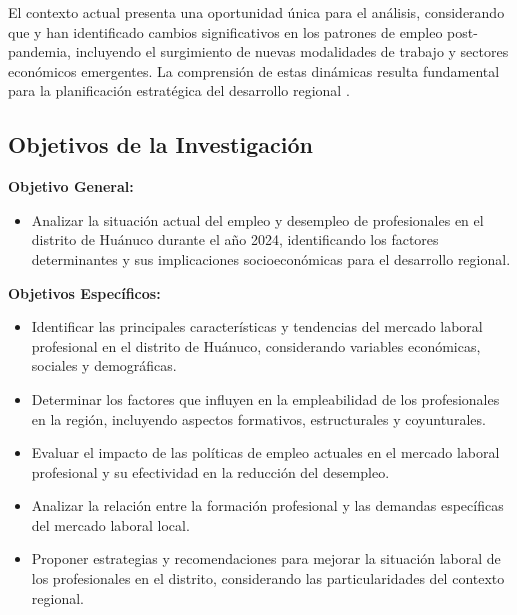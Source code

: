 \documentclass[12pt,a4paper]{article}
\begin{document}
El contexto actual presenta una oportunidad única para el análisis, considerando que \cite{navarro2024oportunidades} y \cite{paz2023mercado} han identificado cambios significativos en los patrones de empleo post-pandemia, incluyendo el surgimiento de nuevas modalidades de trabajo y sectores económicos emergentes. La comprensión de estas dinámicas resulta fundamental para la planificación estratégica del desarrollo regional \citep{guerra2024planificacion, ruiz2023estrategias}.

\subsection{Objetivos de la Investigación}

\textbf{Objetivo General:}
\begin{itemize}
    \item Analizar la situación actual del empleo y desempleo de profesionales en el distrito de Huánuco durante el año 2024, identificando los factores determinantes y sus implicaciones socioeconómicas para el desarrollo regional.
\end{itemize}

\textbf{Objetivos Específicos:}
\begin{itemize}
    \item Identificar las principales características y tendencias del mercado laboral profesional en el distrito de Huánuco, considerando variables económicas, sociales y demográficas.
    \item Determinar los factores que influyen en la empleabilidad de los profesionales en la región, incluyendo aspectos formativos, estructurales y coyunturales.
    \item Evaluar el impacto de las políticas de empleo actuales en el mercado laboral profesional y su efectividad en la reducción del desempleo.
    \item Analizar la relación entre la formación profesional y las demandas específicas del mercado laboral local.
    \item Proponer estrategias y recomendaciones para mejorar la situación laboral de los profesionales en el distrito, considerando las particularidades del contexto regional.
\end{itemize}
\end{document}
